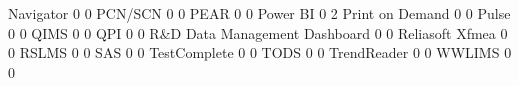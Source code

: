 \documentclass{article}
\begin{document}
\begin{Schunk}
\begin{Soutput}
  Navigator                                                     0            0
  PCN/SCN                                                       0            0
  PEAR                                                          0            0
  Power BI                                                      0            2
  Print on Demand                                               0            0
  Pulse                                                         0            0
  QIMS                                                          0            0
  QPI                                                           0            0
  R&D Data Management Dashboard                                 0            0
  Reliasoft Xfmea                                               0            0
  RSLMS                                                         0            0
  SAS                                                           0            0
  TestComplete                                                  0            0
  TODS                                                          0            0
  TrendReader                                                   0            0
  WWLIMS                                                        0            0
                                                           

\end{Soutput}
\end{Schunk}
\end{document}
